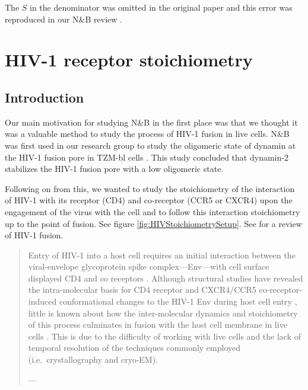 \documentclass[12pt,]{book}
\theoremstyle{definition}
\theoremstyle{definition}
\theoremstyle{definition}
\theoremstyle{remark}
\begin{document}
The \(S\) in the denominator was omitted in the original paper
\citep{Dalal} and this error was reproduced in our N\&B review
\citep{NBreview}.

\section{HIV-1 receptor
stoichiometry}\label{hiv-1-receptor-stoichiometry}

\subsection{Introduction}\label{introduction}

Our main motivation for studying N\&B in the first place was that we
thought it was a valuable method to study the process of HIV-1 fusion in
live cells. N\&B was first used in our research group to study the
oligomeric state of dynamin at the HIV-1 fusion pore in TZM-bl cells
\citep{DanDynamin}. This study concluded that dynamin-2 stabilizes the
HIV-1 fusion pore with a low oligomeric state.

Following on from this, we wanted to study the stoichiometry of the
interaction of HIV-1 with its receptor (CD4) and co-receptor (CCR5 or
CXCR4) upon the engagement of the virus with the cell and to follow this
interaction stoichiometry up to the point of fusion. See figure
\ref{fig:HIVStoichiometrySetup}. See \citet{Jakobsdottir} for a review
of HIV-1 fusion.

\begin{quote}
Entry of HIV-1 into a host cell requires an initial interaction between
the viral-envelope glycoprotein spike complex---Env---with cell surface
displayed CD4 and co receptors \citep{Jakobsdottir}. Although structural
studies have revealed the intra-molecular basis for CD4 receptor and
CXCR4/CCR5 co-receptor-induced conformational changes to the HIV-1 Env
during host cell entry \citep{Ozorowski}, little is known about how the
inter-molecular dynamics and stoichiometry of this process culminates in
fusion with the host cell membrane in live cells \citep{Brandenberg}.
This is due to the difficulty of working with live cells and the lack of
temporal resolution of the techniques commonly employed
(i.e.~crystallography and cryo-EM).

--- \citet{HIVstoichiometry}
\end{quote}
\end{document}
